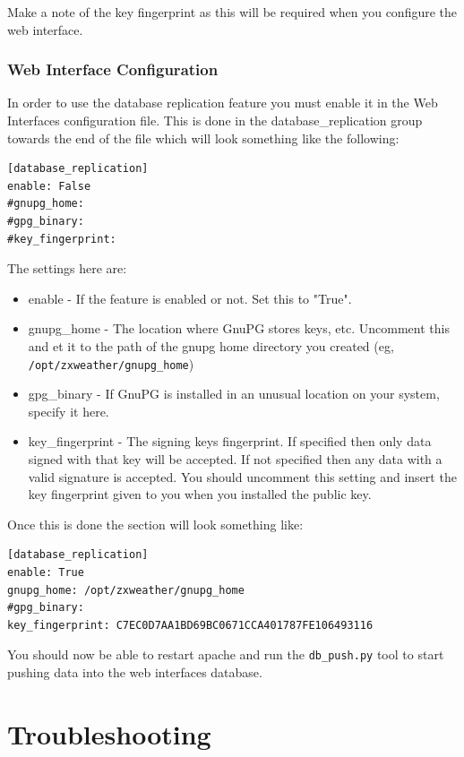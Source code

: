 \documentclass[a4paper,10pt,draft]{book}
\begin{document}
Make a note of the key fingerprint as this will be required when you configure the web interface.

\label{sec_dbr_web_setup}
\subsection{Web Interface Configuration}

In order to use the database replication feature you must enable it in the Web Interfaces configuration file. This is done in the database\_replication group towards the end of the file which will look something like the following:
\begin{verbatim}
[database_replication]
enable: False
#gnupg_home:
#gpg_binary:
#key_fingerprint: 
\end{verbatim}

The settings here are:
\begin{itemize}
\item enable - If the feature is enabled or not. Set this to "True".
\item gnupg\_home - The location where GnuPG stores keys, etc. Uncomment this and et it to the path of the gnupg home directory you created (eg, \verb|/opt/zxweather/gnupg_home|)
\item gpg\_binary - If GnuPG is installed in an unusual location on your system, specify it here.
\item key\_fingerprint - The signing keys fingerprint. If specified then only data signed with that key will be accepted. If not specified then any data with a valid signature is accepted. You should uncomment this setting and insert the key fingerprint given to you when you installed the public key.
\end{itemize}

Once this is done the section will look something like:
\begin{verbatim}
[database_replication]
enable: True
gnupg_home: /opt/zxweather/gnupg_home
#gpg_binary:
key_fingerprint: C7EC0D7AA1BD69BC0671CCA401787FE106493116
\end{verbatim}

You should now be able to restart apache and run the \verb|db_push.py| tool to start pushing data into the web interfaces database.

\chapter{Troubleshooting}
\end{document}
